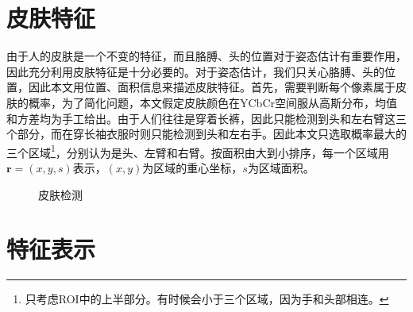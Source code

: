 \section{皮肤特征}
由于人的皮肤是一个不变的特征，而且胳膊、头的位置对于姿态估计有重要作用，因此充分利用皮肤特征是十分必要的。对于姿态估计，我们只关心胳膊、头的位置，因此本文用位置、面积信息来描述皮肤特征。首先，需要判断每个像素属于皮肤的概率，为了简化问题，本文假定皮肤颜色在YCbCr空间服从高斯分布，均值和方差均为手工给出。由于人们往往是穿着长裤，因此只能检测到头和左右臂这三个部分，而在穿长袖衣服时则只能检测到头和左右手。因此本文只选取概率最大的三个区域\footnote{只考虑ROI中的上半部分。有时候会小于三个区域，因为手和头部相连。}，分别认为是头、左臂和右臂。按面积由大到小排序，每一个区域用$\mathbf{r}=(x,y,s)$表示，$(x,y)$为区域的重心坐标，$s$为区域面积。
\begin{figure}[htbp]
  \centering
  \caption{皮肤检测}
\end{figure}

\section{特征表示}
\label{sec:feature}

